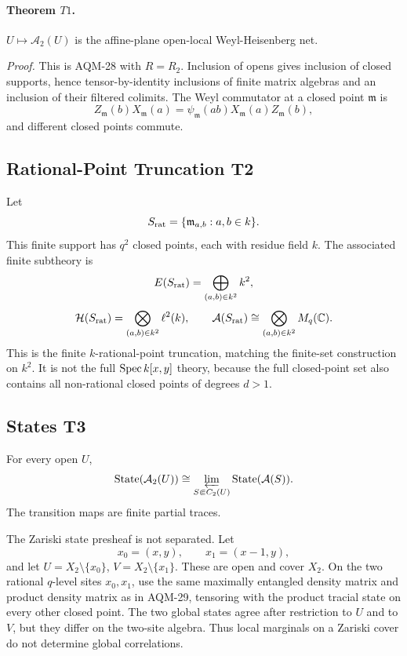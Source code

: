 \paragraph{Theorem \(T1\).}
\(U\mapsto\mathcal A_2(U)\) is the affine-plane open-local
Weyl-Heisenberg net.

\emph{Proof.}
This is AQM-28 with \(R=R_2\).  Inclusion of opens gives inclusion of closed
supports, hence tensor-by-identity inclusions of finite matrix algebras and an
inclusion of their filtered colimits.  The Weyl commutator at a closed point
\(\mathfrak m\) is
\[
  Z_{\mathfrak m}(b)X_{\mathfrak m}(a)
  =
  \psi_{\mathfrak m}(ab)X_{\mathfrak m}(a)Z_{\mathfrak m}(b),
\]
and different closed points commute.

\subsection{Rational-Point Truncation T2}

Let
\[
  S_{\rm rat}=\{\mathfrak m_{a,b}:a,b\in k\}.
\]
This finite support has \(q^2\) closed points, each with residue field \(k\).
The associated finite subtheory is
\[
  E(S_{\rm rat})=\bigoplus_{(a,b)\in k^2}k^2,
\]
\[
  \mathcal H(S_{\rm rat})=\bigotimes_{(a,b)\in k^2}\ell^2(k),
  \qquad
  \mathcal A(S_{\rm rat})\cong
  \bigotimes_{(a,b)\in k^2}M_q(\mathbb C).
\]
This is the finite \(k\)-rational-point truncation, matching the finite-set
construction on \(k^2\).  It is not the full \(\operatorname{Spec} k[x,y]\) theory, because
the full closed-point set also contains all non-rational closed points of
degrees \(d>1\).

\subsection{States T3}

For every open \(U\),
\[
  \operatorname{State}(\mathcal A_2(U))
  \cong
  \varprojlim_{S\Subset C_2(U)}
  \operatorname{State}(\mathcal A(S)).
\]
The transition maps are finite partial traces.

The Zariski state presheaf is not separated.  Let
\[
  x_0=(x,y),\qquad x_1=(x-1,y),
\]
and let \(U=X_2\setminus\{x_0\}\), \(V=X_2\setminus\{x_1\}\).  These are open
and cover \(X_2\).  On the two rational \(q\)-level sites \(x_0,x_1\), use
the same maximally entangled density matrix and product density matrix as in
AQM-29, tensoring with the product tracial state on every other closed point.
The two global states agree after restriction to \(U\) and to \(V\), but they
differ on the two-site algebra.  Thus local marginals on a Zariski cover do
not determine global correlations.

